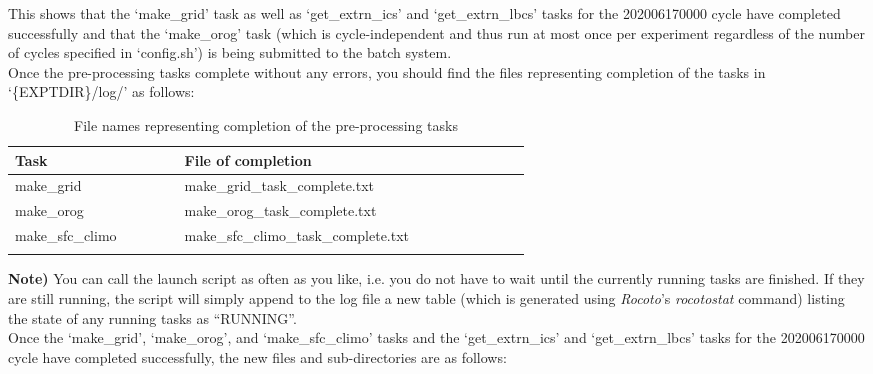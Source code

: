 \documentclass[11pt,fleqn]{report}              %
\begin{document}
This shows that the `make\_grid' task as well as `get\_extrn\_ics' and `get\_extrn\_lbcs' tasks for the 202006170000 cycle have completed successfully and that the `make\_orog' task (which is cycle-independent and thus run at most once per experiment regardless of the number of cycles specified in `config.sh') is being submitted to the batch system. \\

Once the pre-processing tasks complete without any errors, you should find the files representing completion of the tasks in `\{EXPTDIR\}/log/' as follows:
{
\fontsize{10}{12}\selectfont
\begin{longtable}{ p{0.2\linewidth} | p{0.4\linewidth} }
\hline
\hline
 Task & File of completion \\
\hline
 make\_grid & make\_grid\_task\_complete.txt \\
 make\_orog & make\_orog\_task\_complete.txt \\
 make\_sfc\_climo & make\_sfc\_climo\_task\_complete.txt \\ 
\hline
\caption{File names representing completion of the pre-processing tasks }
\label{table:wflow_fn_taskcomplete}
\end{longtable}
}


{\bf Note)} You can call the launch script as often as you like, i.e. you do not have to wait until the currently running tasks are finished. If they are still running, the script will simply append to the log file a new table (which is generated using {\it Rocoto}'s {\it rocotostat} command) listing the state of any running tasks as ``RUNNING''. \\

Once the `make\_grid', `make\_orog', and `make\_sfc\_climo' tasks and the `get\_extrn\_ics' and `get\_extrn\_lbcs' tasks for the 202006170000 cycle have completed successfully, the new files and sub-directories are as follows:
\end{document}
